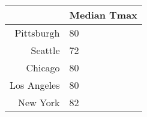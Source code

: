 \begin{table}[ht]
\centering
\begin{tabular}{rl}
  \hline
 & Median Tmax \\ 
  \hline
Pittsburgh & 80 \\ 
  Seattle & 72 \\ 
  Chicago & 80 \\ 
  Los Angeles & 80 \\ 
  New York & 82 \\ 
   \hline
\end{tabular}
\end{table}
